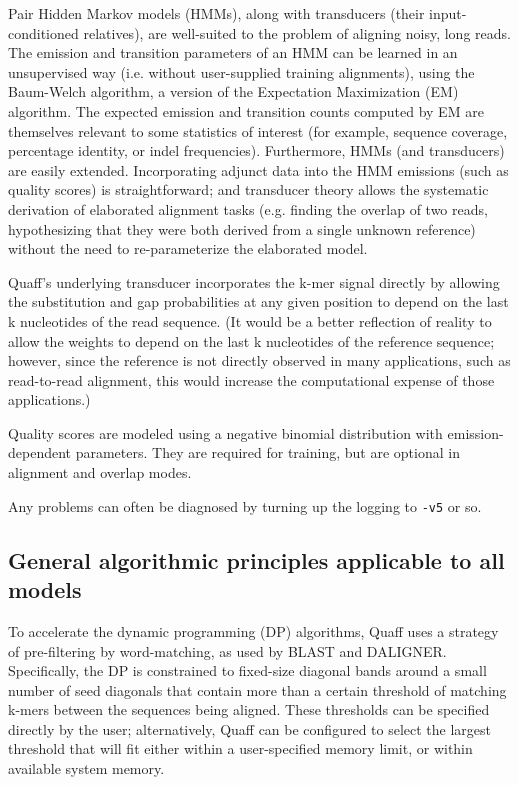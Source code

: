 \documentclass{article}
\newcommand\opt[1]{{\tt -#1}}
\begin{document}
Pair Hidden Markov models (HMMs), along with transducers (their input-conditioned relatives), are well-suited to the problem of aligning noisy, long reads. The emission and transition parameters of an HMM can be learned in an unsupervised way (i.e. without user-supplied training alignments), using the Baum-Welch algorithm, a version of the Expectation Maximization (EM) algorithm. The expected emission and transition counts computed by EM are themselves relevant to some statistics of interest (for example, sequence coverage, percentage identity, or indel frequencies). Furthermore, HMMs (and transducers) are easily extended. Incorporating adjunct data into the HMM emissions (such as quality scores) is straightforward; and transducer theory allows the systematic derivation of elaborated alignment tasks (e.g. finding the overlap of two reads, hypothesizing that they were both derived from a single unknown reference) without the need to re-parameterize the elaborated model.

Quaff's underlying transducer incorporates the k-mer signal directly by allowing the substitution and gap probabilities at any given position to depend on the last k nucleotides of the read sequence. (It would be a better reflection of reality to allow the weights to depend on the last k nucleotides of the reference sequence; however, since the reference is not directly observed in many applications, such as read-to-read alignment, this would increase the computational expense of those applications.)

Quality scores are modeled using a negative binomial distribution with emission-dependent parameters. They are required for training, but are optional in alignment and overlap modes.

Any problems can often be diagnosed by turning up the logging to \opt{v5} or so.


\subsection{General algorithmic principles applicable to all models}

To accelerate the dynamic programming (DP) algorithms, Quaff uses a strategy of pre-filtering by word-matching, as used by BLAST and DALIGNER. Specifically, the DP is constrained to fixed-size diagonal bands around a small number of seed diagonals that contain more than a certain threshold of matching k-mers between the sequences being aligned. These thresholds can be specified directly by the user; alternatively, Quaff can be configured to select the largest threshold that will fit either within a user-specified memory limit, or within available system memory.
\end{document}
